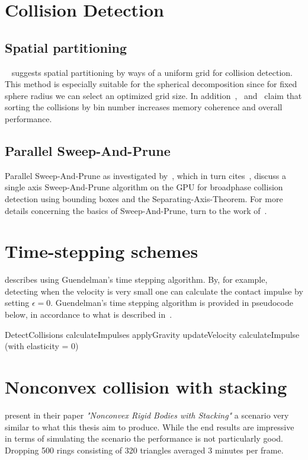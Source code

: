 \section{Collision Detection}\label{sec:gridCD}
\subsection{Spatial partitioning}
~\cite{gpugems} suggests spatial partitioning
by ways of a uniform grid for collision detection. This method is especially suitable
for the spherical decomposition since for fixed sphere radius we can select an optimized
grid size. In addition~\cite{gpugems},~\cite{green} and~\cite{fastnearest} claim that sorting
the collisions by bin number increases memory coherence and overall performance.
\subsection{Parallel Sweep-And-Prune}
Parallel Sweep-And-Prune as investigated by~\cite{gpupipedev}, which in turn cites~\cite{liu2010}, %
discuss a single axis Sweep-And-Prune algorithm on the GPU for broadphase collision
detection using bounding boxes and the Separating-Axis-Theorem. For more details
concerning the basics of Sweep-And-Prune, turn to the work of~\cite{SAPPierre}.

\section{Time-stepping schemes}
\cite{Lembcke} describes using Guendelman's time stepping
algorithm. By, for example, detecting when the velocity is very small one can
calculate the contact impulse by setting $\epsilon = 0$.
Guendelman's time stepping algorithm is provided in pseudocode below, in accordance
to what is described in~\cite{guendelman}.

\begin{algorithm}[H]
  \begin{algorithmic}[1]
  \State DetectCollisions
    \State calculateImpulses
  \EndFor
  \State applyGravity
  \State updateVelocity
      \State calculateImpulse (with elasticity = 0)
    \EndFor
\end{algorithmic}
\end{algorithm}

\section{Nonconvex collision with stacking}
\cite{guendelman} present in their paper \textit{"Nonconvex Rigid Bodies with Stacking"}
a scenario very similar to what this thesis aim to produce.
While the end results are impressive in terms of simulating the scenario the performance
is not particularly good. Dropping 500 rings consisting of 320 triangles averaged 3 minutes per frame.
